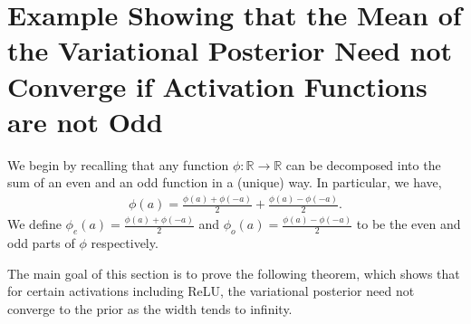 \documentclass[twoside]{article}
\renewcommand{\P}{\mathbb{P}}
\newcommand{\Q}{\mathbb{Q}}
\renewcommand{\Q}{\ensuremath{Q}}
\renewcommand{\P}{\ensuremath{P}}
\newcommand{\R}{\mathbb{R}}
\newcommand{\KL}{\operatorname{KL}}
\theoremstyle{theoremstyle}
\begin{document}




\section{Example Showing that the Mean of the Variational Posterior Need not Converge if Activation Functions are not Odd}\label{app:counterexample}

We begin by recalling that any function $\phi: \R \to \R$ can be decomposed into the sum of an even and an odd function in a (unique) way. In particular, we have,
\begin{align}
    \phi(a) = \frac{\phi(a)+\phi(-a)}{2}+\frac{\phi(a)-\phi(-a)}{2}.
\end{align}
We define $\phi_{e}(a)=\frac{\phi(a)+\phi(-a)}{2}$ and $\phi_{o}(a) =\frac{\phi(a)-\phi(-a)}{2}$ to be the even and odd parts of $\phi$ respectively.


The main goal of this section is to prove the following theorem, which shows that for certain activations including ReLU, the variational posterior need not converge to the prior as the width tends to infinity.
\end{document}
